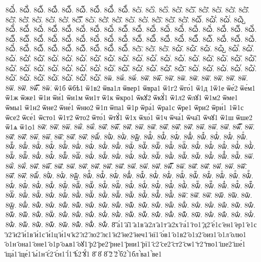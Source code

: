 {8ѽ҅ꙷ.
8ѽ҅ꙸ.
8ѽ҅ꙹ.
8ѽ҅ꙺ.
8ѽ҅ꙻ.
8ѽ҅꙼.
8ѽ҅꙽.
8ѽ҅ꚞ.
8ѽ҅ꚟ.
8ѽ҆.
8ѽ҆̀.
8ѽ҆́.
8ѽ҆̂.
8ѽ҆̅.
8ѽ҆̆.
8ѽ҆̇.
8ѽ҆̈.
8ѽ҆̋.
8ѽ҆̏.
8ѽ҆̑.
8ѽ҆̓.
8ѽ҆̔.
8ѽ҆̾.
8ѽ҆̿.
8ѽ҆͘.
8ѽ҆҃.
8ѽ҆҄.
8ѽ҆҅.
8ѽ҆҆.
8ѽ҆҇.
8ѽ҆᷀.
8ѽ҆᷁.
8ѽ҆᷶.
8ѽ᷷҆.
8ѽ᷸҆.
8ѽ᷹҆.
8ѽ҆ⷠ.
8ѽ҆ⷡ.
8ѽ҆ⷢ.
8ѽ҆ⷣ.
8ѽ҆ⷤ.
8ѽ҆ⷥ.
8ѽ҆ⷦ.
8ѽ҆ⷧ.
8ѽ҆ⷨ.
8ѽ҆ⷩ.
8ѽ҆ⷪ.
8ѽ҆ⷫ.
8ѽ҆ⷬ.
8ѽ҆ⷭ.
8ѽ҆ⷮ.
8ѽ҆ⷯ.
8ѽ҆ⷰ.
8ѽ҆ⷱ.
8ѽ҆ⷲ.
8ѽ҆ⷳ.
8ѽ҆ⷴ.
8ѽ҆ⷵ.
8ѽ҆ⷶ.
8ѽ҆ⷷ.
8ѽ҆ⷸ.
8ѽ҆ⷹ.
8ѽ҆ⷺ.
8ѽ҆ⷻ.
8ѽ҆ⷼ.
8ѽ҆ⷽ.
8ѽ҆ⷾ.
8ѽ҆ⷿ.
8ѽ҆꙯.
8ѽ҆ꙴ.
8ѽ҆ꙵ.
8ѽ҆ꙶ.
8ѽ҆ꙷ.
8ѽ҆ꙸ.
8ѽ҆ꙹ.
8ѽ҆ꙺ.
8ѽ҆ꙻ.
8ѽ҆꙼.
8ѽ҆꙽.
8ѽ҆ꚞ.
8ѽ҆ꚟ.
8ѽ҇.
8ѽ᷀.
8ѽ᷁.
8ѽ᷶.
8ѽ᷷.
8ѽ᷸.
8ѽ᷹.
8ѽⷠ.
8ѽⷡ.
8ѽⷢ.
8ѽⷣ.
8ѽⷤ.
8ѽⷥ.
8ѽⷦ.
8ѽⷧ.
8ѽⷨ.
8ѽⷩ.
8ѽⷪ.
8ѽⷫ.
8ѽⷬ.
8ѽⷭ.
8ѽⷮ.
8ѽⷯ.
8ѽⷰ.
8ѽⷱ.
8ѽⷲ.
8ѽⷳ.
8ѽⷴ.
8ѽⷵ.
8ѽⷶ.
8ѽⷷ.
8ѽⷸ.
8ѽⷹ.
8ѽⷺ.
8ѽⷻ.
8ѽⷼ.
8ѽⷽ.
8ѽⷾ.
8ѽⷿ.
8ѽ꙯.
8ѽꙴ.
8ѽꙵ.
8ѽꙶ.
8ѽꙷ.
8ѽꙸ.
8ѽꙹ.
8ѽꙺ.
8ѽꙻ.
8ѽ꙼.
8ѽ꙽.
8ѽꚞ.
8ѽꚟ.
8ѿ.
8ѿ̀.
8ѿ́.
8ѿ̂.
8ѿ̅.
8ѿ̆.
8ѿ̇.
8ѿ̈.
8ѿ̋.
8ѿ̏.
8ѿ̑.
8ѿ̓.
8ѿ̔.
8ѿ̾.
8ѿ̿.
8ѿ͘.
ѿ1б
ѿбѣ1
ѿ1в2
ѿва1л
ѿвер1
ѿвра1
ѿ1г2
ѿго́1
ѿ1д
1ѿ1е
ѿе́2
ѿе́м1
ѿ1ж
ѿже1
ѿ1и
ѿи́1
ѿи1м
ѿи1т
ѿ1к
ѿкро1
ѿкꙋ2
ѿкꙋ́1
ѿ1л2
ѿлꙋ1
ѿ1м2
ѿме1
ѿмы1
ѿ1н2
ѿне2
ѿне́1
ѿню2
ѿ1п
ѿпа1
ѿ1р
ѿра́1
ѿра1с
ѿре1
ѿри2
ѿри́1
1ѿ1с
ѿсе2
ѿсе́1
ѿсто1
ѿ1т2
ѿто2
ѿто́1
ѿтꙋ́1
ѿ1х
ѿхо́1
ѿ1ч
ѿча́1
ѿча̑1
ѿчꙋ1
ѿ1ш
ѿше2
ѿ1ѧ
ѿ1ѻ1
8ѿ҃.
8ѿ҄.
8ѿ҅.
8ѿ҅̀.
8ѿ҅́.
8ѿ҅̂.
8ѿ҅̅.
8ѿ҅̆.
8ѿ҅̇.
8ѿ҅̈.
8ѿ҅̋.
8ѿ҅̏.
8ѿ҅̑.
8ѿ҅̓.
8ѿ҅̔.
8ѿ҅̾.
8ѿ҅̿.
8ѿ҅͘.
8ѿ҅҃.
8ѿ҅҄.
8ѿ҅҅.
8ѿ҅҆.
8ѿ҅҇.
8ѿ҅᷀.
8ѿ҅᷁.
8ѿ҅᷶.
8ѿ᷷҅.
8ѿ᷸҅.
8ѿ᷹҅.
8ѿ҅ⷠ.
8ѿ҅ⷡ.
8ѿ҅ⷢ.
8ѿ҅ⷣ.
8ѿ҅ⷤ.
8ѿ҅ⷥ.
8ѿ҅ⷦ.
8ѿ҅ⷧ.
8ѿ҅ⷨ.
8ѿ҅ⷩ.
8ѿ҅ⷪ.
8ѿ҅ⷫ.
8ѿ҅ⷬ.
8ѿ҅ⷭ.
8ѿ҅ⷮ.
8ѿ҅ⷯ.
8ѿ҅ⷰ.
8ѿ҅ⷱ.
8ѿ҅ⷲ.
8ѿ҅ⷳ.
8ѿ҅ⷴ.
8ѿ҅ⷵ.
8ѿ҅ⷶ.
8ѿ҅ⷷ.
8ѿ҅ⷸ.
8ѿ҅ⷹ.
8ѿ҅ⷺ.
8ѿ҅ⷻ.
8ѿ҅ⷼ.
8ѿ҅ⷽ.
8ѿ҅ⷾ.
8ѿ҅ⷿ.
8ѿ҅꙯.
8ѿ҅ꙴ.
8ѿ҅ꙵ.
8ѿ҅ꙶ.
8ѿ҅ꙷ.
8ѿ҅ꙸ.
8ѿ҅ꙹ.
8ѿ҅ꙺ.
8ѿ҅ꙻ.
8ѿ҅꙼.
8ѿ҅꙽.
8ѿ҅ꚞ.
8ѿ҅ꚟ.
8ѿ҆.
8ѿ҆̀.
8ѿ҆́.
8ѿ҆̂.
8ѿ҆̅.
8ѿ҆̆.
8ѿ҆̇.
8ѿ҆̈.
8ѿ҆̋.
8ѿ҆̏.
8ѿ҆̑.
8ѿ҆̓.
8ѿ҆̔.
8ѿ҆̾.
8ѿ҆̿.
8ѿ҆͘.
8ѿ҆҃.
8ѿ҆҄.
8ѿ҆҅.
8ѿ҆҆.
8ѿ҆҇.
8ѿ҆᷀.
8ѿ҆᷁.
8ѿ҆᷶.
8ѿ᷷҆.
8ѿ᷸҆.
8ѿ᷹҆.
8ѿ҆ⷠ.
8ѿ҆ⷡ.
8ѿ҆ⷢ.
8ѿ҆ⷣ.
8ѿ҆ⷤ.
8ѿ҆ⷥ.
8ѿ҆ⷦ.
8ѿ҆ⷧ.
8ѿ҆ⷨ.
8ѿ҆ⷩ.
8ѿ҆ⷪ.
8ѿ҆ⷫ.
8ѿ҆ⷬ.
8ѿ҆ⷭ.
8ѿ҆ⷮ.
8ѿ҆ⷯ.
8ѿ҆ⷰ.
8ѿ҆ⷱ.
8ѿ҆ⷲ.
8ѿ҆ⷳ.
8ѿ҆ⷴ.
8ѿ҆ⷵ.
8ѿ҆ⷶ.
8ѿ҆ⷷ.
8ѿ҆ⷸ.
8ѿ҆ⷹ.
8ѿ҆ⷺ.
8ѿ҆ⷻ.
8ѿ҆ⷼ.
8ѿ҆ⷽ.
8ѿ҆ⷾ.
8ѿ҆ⷿ.
8ѿ҆꙯.
8ѿ҆ꙴ.
8ѿ҆ꙵ.
8ѿ҆ꙶ.
8ѿ҆ꙷ.
8ѿ҆ꙸ.
8ѿ҆ꙹ.
8ѿ҆ꙺ.
8ѿ҆ꙻ.
8ѿ҆꙼.
8ѿ҆꙽.
8ѿ҆ꚞ.
8ѿ҆ꚟ.
8ѿ҇.
8ѿ᷀.
8ѿ᷁.
8ѿ᷶.
8ѿ᷷.
8ѿ᷸.
8ѿ᷹.
8ѿⷠ.
8ѿⷡ.
8ѿⷢ.
8ѿⷣ.
8ѿⷤ.
8ѿⷥ.
8ѿⷦ.
8ѿⷧ.
8ѿⷨ.
8ѿⷩ.
8ѿⷪ.
8ѿⷫ.
8ѿⷬ.
8ѿⷭ.
8ѿⷮ.
8ѿⷯ.
8ѿⷰ.
8ѿⷱ.
8ѿⷲ.
8ѿⷳ.
8ѿⷴ.
8ѿⷵ.
8ѿⷶ.
8ѿⷷ.
8ѿⷸ.
8ѿⷹ.
8ѿⷺ.
8ѿⷻ.
8ѿⷼ.
8ѿⷽ.
8ѿⷾ.
8ѿⷿ.
8ѿ꙯.
8ѿꙴ.
8ѿꙵ.
8ѿꙶ.
8ѿꙷ.
8ѿꙸ.
8ѿꙹ.
8ѿꙺ.
8ѿꙻ.
8ѿ꙼.
8ѿ꙽.
8ѿꚞ.
8ѿꚟ.
8҃
҃а́1
҃а̑1
҃а1в
҃а2л
҃а1т
҃а2х
҃га́1
҃го1
҃д2
҃е́1с
҃ен1
҃ер1
҃е1с
҃з2
҃и2
҃и́1в
҃и́1с
҃и́1ц
҃и́1ч
҃к2
҃л2
҃ло2
҃лє1
҃н2
҃не2
҃неч1
҃нї1
҃о́в1
҃о1в2
҃о1з2
҃оиз1
҃о1л
҃олю1
҃о1н
҃она1
҃оне1
҃о1р
҃оѧв1
҃оꙋ1
҃р2
҃ре2
҃рне1
҃рни1
҃рї1
҃с2
҃се2
҃ст2
҃сѡ1
҃т2
҃тво1
҃ше2
҃ше́1
҃ща́1
҃ще́1
҃ы́1н
҃є́2
҃є́н1
҃і́1
҃ѣ́2
҃ꙋ́1
8҄
8҅
8҆
҆2̀
҆2́
҆́б2
҆́1бл
҆́ва1
҆́ве1
}
